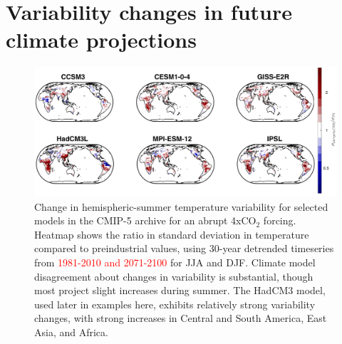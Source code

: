 \documentclass[10pt]{article}
\begin{document}
{{\clearpage
\section{Variability changes in future climate projections}
\begin{figure}[h!]
  \centering
  \includegraphics[width = 16.3cm]{tas_Amon_LRM6_abrupt4x_control_LF_maps_JJA_final.png}
  \caption{
	  Change in hemispheric-summer temperature variability for selected models in the CMIP-5 archive for an abrupt 4xCO$_2$ forcing. Heatmap shows the ratio in standard deviation in temperature compared to preindustrial values, using 30-year detrended timeseries from \textcolor{red}{1981-2010 and 2071-2100} for JJA and DJF.   
   Climate model disagreement about changes in variability is substantial, though most project slight increases during summer. The HadCM3 model, used later in examples here, exhibits relatively strong variability changes, with strong increases in Central and South America, East Asia, and Africa.
  }
  \label{fig:lpjmlrcp}
\end{figure}


\clearpage
}}
\end{document}
